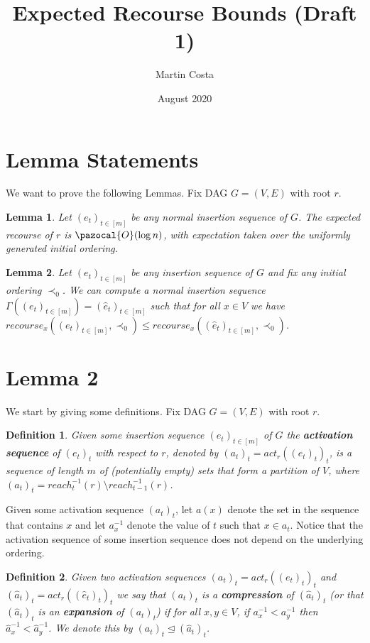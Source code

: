 \documentclass{article}
\title{Expected Recourse Bounds (Draft 1)}
\author{Martin Costa}
\date{August 2020}
\newtheorem{lemma}{Lemma}
\newtheorem{definition}{Definition}
\begin{document}
\maketitle

\section{Lemma Statements}

We want to prove the following Lemmas. Fix DAG $G=(V,E)$ with root $r$.

\begin{lemma}
Let $(e_t)_{t \in [m]}$ be any normal insertion sequence of $G$. The expected recourse of $r$ is $\pazocal{O}(\log n)$, with expectation taken over the uniformly generated initial ordering.
\end{lemma}

\begin{lemma}
Let $(e_t)_{t \in [m]}$ be any insertion sequence of $G$ and fix any initial ordering $\prec_0$. We can compute a normal insertion sequence $\Gamma((e_t)_{t \in [m]}) = (\hat{e}_t)_{t \in [m]}$ such that for all $x \in V$ we have $recourse_x((e_t)_{t \in [m]}, \prec_0) \leq recourse_x((\hat{e}_t)_{t \in [m]}, \prec_0)$.
\end{lemma}

\section{Lemma 2}

We start by giving some definitions. Fix DAG $G=(V,E)$ with root $r$.

\begin{definition}
Given some insertion sequence $(e_t)_{t \in [m]}$ of $G$ the \textbf{activation sequence} of $(e_t)_t$ with respect to $r$, denoted by $(a_t)_t = act_r((e_t)_t)_t$, is a sequence of length $m$ of (potentially empty) sets that form a partition of $V$, where $(a_t)_t = reach_{t}^{-1}(r) \setminus reach_{t-1}^{-1}(r)$.
\end{definition}

Given some activation sequence $(a_t)_t$, let $a(x)$ denote the set in the sequence that contains $x$ and let $a^{-1}_x$ denote the value of $t$ such that $x \in a_t$. Notice that the activation sequence of some insertion sequence does not depend on the underlying ordering.

\begin{definition}
Given two activation sequences $(a_t)_t = act_r((e_t)_t)_t$ and $(\hat{a}_t)_t = act_r((\hat{e}_t)_t)_t$ we say that $(a_t)_t$ is a \textbf{compression} of $(\hat{a}_t)_t$ (or that $(\hat{a}_t)_t$ is an \textbf{expansion} of $(a_t)_t$) if for all $x,y \in V$, if $a^{-1}_x < a^{-1}_y$ then $\hat{a}^{-1}_x < \hat{a}^{-1}_y$. We denote this by $(a_t)_t \trianglelefteq (\hat{a}_t)_t$.
\end{definition}
\end{document}
